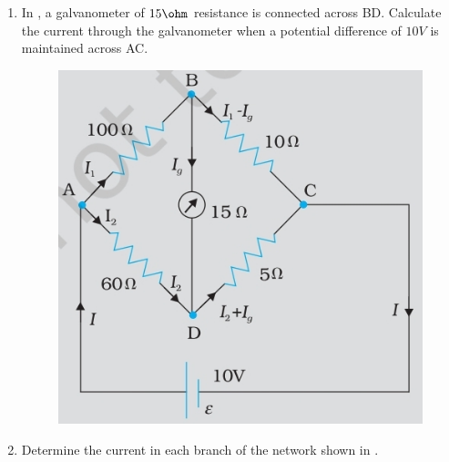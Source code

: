 \begin{enumerate}[label=\thesubsection.\arabic*.,ref=\thesubsection.\theenumi]
\begin{figure}[H]
\end{figure}
	\item In , a galvanometer of $15\ohm$ resistance is connected across BD. Calculate the current through the galvanometer when a potential difference of $10 V$ is maintained across AC.
		\begin{figure}[H] 
    \centering
    \includegraphics[width=\columnwidth]{figs/ckts/ckt3.jpg} %
    \caption{} 
    \label{fig:ckt3} 
\end{figure}
	\item Determine the current in each branch of the network shown in 
.
		\begin{figure}[H] 
    \centering

\end{figure}
\end{enumerate}
